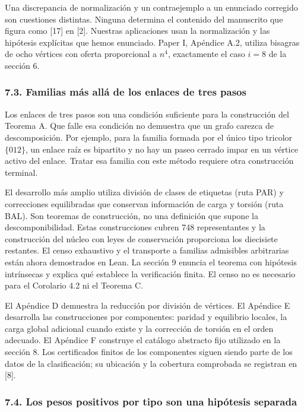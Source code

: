 \documentclass[spanish,11pt,a4paper]{article}
\begin{document}
Una discrepancia de normalización y un contraejemplo a un enunciado corregido son cuestiones distintas. Ninguna determina el contenido del manuscrito que figura como {[}17{]} en {[}2{]}. Nuestras aplicaciones usan la normalización y las hipótesis explícitas que hemos enunciado. Paper I, Apéndice A.2, utiliza bisagras de ocho vértices con oferta proporcional a \(n^4\), exactamente el caso \(i=8\) de la sección 6.

\subsubsection{7.3. Familias más allá de los enlaces de tres pasos}\label{familias-muxe1s-alluxe1-de-los-enlaces-de-tres-pasos}

Los enlaces de tres pasos son una condición suficiente para la construcción del Teorema A. Que falle esa condición no demuestra que un grafo carezca de descomposición. Por ejemplo, para la familia formada por el único tipo tricolor \(\{012\}\), un enlace raíz es bipartito y no hay un paseo cerrado impar en un vértice activo del enlace. Tratar esa familia con este método requiere otra construcción terminal.

El desarrollo más amplio utiliza división de clases de etiquetas (ruta PAR) y correcciones equilibradas que conservan información de carga y torsión (ruta BAL). Son teoremas de construcción, no una definición que supone la descomponibilidad. Estas construcciones cubren 748 representantes y la construcción del núcleo con leyes de conservación proporciona los diecisiete restantes. El censo exhaustivo y el transporte a familias admisibles arbitrarias están ahora demostrados en Lean. La sección 9 enuncia el teorema con hipótesis intrínsecas y explica qué establece la verificación finita. El censo no es necesario para el Corolario 4.2 ni el Teorema C.

El Apéndice D demuestra la reducción por división de vértices. El Apéndice E desarrolla las construcciones por componentes: paridad y equilibrio locales, la carga global adicional cuando existe y la corrección de torsión en el orden adecuado. El Apéndice F construye el catálogo abstracto fijo utilizado en la sección 8. Los certificados finitos de los componentes siguen siendo parte de los datos de la clasificación; su ubicación y la cobertura comprobada se registran en {[}8{]}.

\subsubsection{7.4. Los pesos positivos por tipo son una hipótesis separada}\label{los-pesos-positivos-por-tipo-son-una-hipuxf3tesis-separada}
\end{document}
